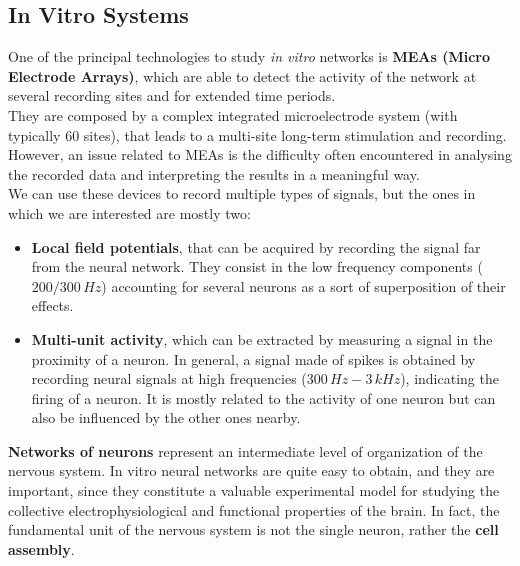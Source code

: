 \subsection{In Vitro Systems}
One of the principal technologies to study \textit{in vitro} networks is
\textbf{MEAs (Micro Electrode Arrays)}, which are able to detect the
activity of the network at several recording sites and for extended time
periods.\\
They are composed by a complex integrated microelectrode system (with
typically 60 sites), that leads to a multi-site long-term stimulation and
recording.
However, an issue related to MEAs is the difficulty often encountered in
analysing the recorded data
and interpreting the results in a meaningful way.\\
We can use these devices to record multiple types of signals, but the ones
in which we are interested are mostly two:
\begin{itemize}
    \item \textbf{Local field potentials}, that can be acquired by
          recording the signal far from the neural network. They consist in the low
          frequency components (\(200/300\,Hz\)) accounting for several neurons as a sort
          of superposition of their effects.
    \item \textbf{Multi-unit activity}, which can be extracted by
          measuring a signal in the proximity of a neuron.  In general, a signal made
          of spikes is obtained by recording neural signals at high frequencies
          (\(300\,Hz-3\,kHz\)), indicating the firing of a neuron. It is mostly related to the
          activity of one neuron but can also be influenced by the other ones
          nearby.
\end{itemize}

\textbf{Networks of neurons} represent an intermediate level of
organization of the nervous system.
In vitro neural networks are quite easy to obtain, and they are important,
since they constitute a valuable experimental model for studying the
collective electrophysiological and functional properties of the brain. In
fact, the fundamental unit of the nervous system is not the single neuron,
rather the \textbf{cell assembly}.\\

